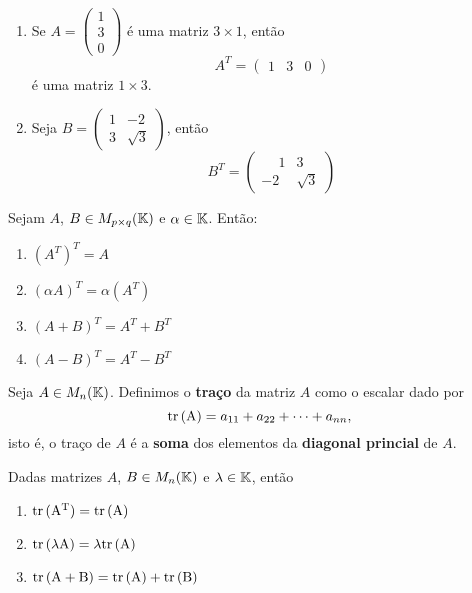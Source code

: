 \begin{exemplos}
\begin{enumerate}
        \item Se $A = \begin{pmatrix}1 \\ 3\\ 0\end{pmatrix}$ é uma matriz $3 \times 1$, então
            \[
                A^T = \begin{pmatrix}1 & 3 & 0\end{pmatrix}
            \]
            é uma matriz $1 \times 3$.

        \item Seja $B = \begin{pmatrix}1 & -2\\3 & \sqrt{3}\end{pmatrix}$, então
            \[
                B^T = \begin{pmatrix}
                    \phantom{-}1 & 3\\
                    -2 & \sqrt{3}
                \end{pmatrix}
            \]
    \end{enumerate}
\end{exemplos}


\begin{proposicao}
    Sejam $A$, $B \in M_{p\times q}(\mathbb{K})$ e $\alpha \in \mathbb{K}$. Então:
    \begin{enumerate}
        \item $(A^T)^T = A$

        \item $(\alpha A)^T = \alpha(A^T)$

        \item $(A + B)^T = A^T + B^T$

        \item $(A - B)^T = A^T - B^T$
    \end{enumerate}
\end{proposicao}

\begin{definicao}
    Seja $A \in M_n(\mathbb{K})$. Definimos o \textbf{traço} da matriz $A$ como o escalar dado por
    \[
        {\rm tr\,(A)} = a_{11} + a_{22} + \cdots + a_{nn},
    \]
    isto é, o traço de $A$ é a \textbf{soma} dos elementos da \textbf{diagonal princial} de $A$.
\end{definicao}

\begin{proposicao}
    Dadas matrizes $A$, $B \in M_n(\mathbb{K})$ e $\lambda \in \mathbb{K}$, então
    \begin{enumerate}
        \item ${\rm tr\,(A^T)} = {\rm tr\,(A)}$

        \item ${\rm tr\,(\lambda A)} = \lambda{\rm tr\,(A)}$

        \item ${\rm tr\,(A + B)} = {\rm tr\,(A)} + {\rm tr\,(B)}$
    \end{enumerate}
\end{proposicao}

